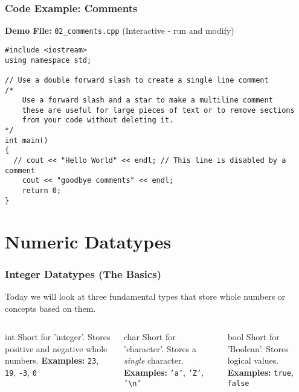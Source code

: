 \documentclass{beamer}
\begin{document}
\begin{frame}[fragile]
\frametitle{Code Example: Comments}
\textbf{Demo File:} \texttt{02\_comments.cpp} (Interactive - run and modify)
\begin{verbatim}
#include <iostream>
using namespace std;

// Use a double forward slash to create a single line comment
/*
    Use a forward slash and a star to make a multiline comment
    these are useful for large pieces of text or to remove sections
    from your code without deleting it.
*/
int main()
{
  // cout << "Hello World" << endl; // This line is disabled by a comment
    cout << "goodbye comments" << endl;
    return 0;
}
\end{verbatim}
\end{frame}

\section{Numeric Datatypes}

\begin{frame}
\frametitle{Integer Datatypes (The Basics)}
Today we will look at three fundamental types that store whole numbers or concepts based on them.\pause

\begin{columns}[T]
    \begin{column}{0.33\textwidth}
        \begin{alertblock}{int}
        Short for 'integer'. Stores positive and negative whole numbers.
        \vspace{1em}
        \textbf{Examples:} \texttt{23}, \texttt{19}, \texttt{-3}, \texttt{0}
        \end{alertblock}
    \end{column}\pause
    \begin{column}{0.33\textwidth}
        \begin{exampleblock}{char}
        Short for 'character'. Stores a \textit{single} character.
        \vspace{1em}
        \textbf{Examples:} \texttt{'a'}, \texttt{'Z'}, \texttt{'\textbackslash n'}
        \end{exampleblock}
    \end{column}\pause
    \begin{column}{0.33\textwidth}
        \begin{block}{bool}
        Short for 'Boolean'. Stores logical values.
        \vspace{1em}
        \textbf{Examples:} \texttt{true}, \texttt{false}
        \end{block}
    \end{column}
\end{columns}
\end{frame}
\end{document}
